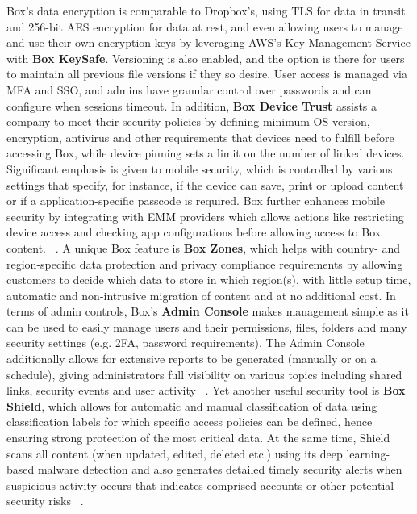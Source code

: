 Box's data encryption is comparable to Dropbox's, using TLS for data in transit and 256-bit AES encryption for data at rest, and even allowing users to manage and use their own encryption keys by leveraging AWS's Key Management Service with \textbf{Box KeySafe}. Versioning is also enabled, and the option is there for users to maintain all previous file versions if they so desire. User access is managed via MFA and SSO, and admins have granular control over passwords and can configure when sessions timeout. In addition, \textbf{Box Device Trust}  assists a company to meet their security policies by defining minimum OS version, encryption, antivirus and other requirements that devices need to fulfill before accessing Box, while device pinning sets a limit on the number of linked devices. Significant emphasis is given to mobile security, which is controlled by various settings that specify, for instance, if the device can save, print or upload content or if a application-specific passcode is required. Box further enhances mobile security by integrating with EMM providers which allows actions like restricting device access and checking app configurations before allowing access to Box content. ~\cite{box_mobile,box_emm}. A unique Box feature is \textbf{Box Zones}, which helps with country- and region-specific data protection and privacy compliance requirements by allowing customers to decide which data to store in which region(s), with little setup time, automatic and non-intrusive migration of content and at no additional cost. In terms of admin controls, Box's \textbf{Admin Console} makes management simple as it can be used to easily manage users and their permissions, files, folders and many security settings (e.g. 2FA, password requirements). The Admin Console additionally  allows for extensive reports to be generated (manually or on a schedule), giving administrators full visibility on various topics including shared links, security events and user activity ~\cite{box_admin}. Yet another useful security tool is \textbf{Box Shield}, which allows for automatic and manual classification of data using classification labels for which specific access policies can be defined, hence ensuring strong protection of the most critical data. At the same time, Shield scans all content (when updated, edited, deleted etc.) using its deep learning-based malware detection and also generates detailed timely security alerts when suspicious activity occurs that indicates comprised accounts or other potential security risks ~\cite{box}. 

